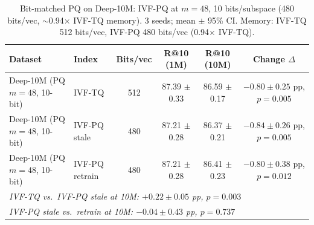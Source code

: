 \begin{table}[t]
\caption{Bit-matched PQ on Deep-10M: IVF-PQ at $m{=}48$, 10 bits/subspace (480 bits/vec, $\sim$0.94$\times$ IVF-TQ memory). 3 seeds; mean $\pm$ 95\% CI. Memory: IVF-TQ 512 bits/vec, IVF-PQ 480 bits/vec (0.94$\times$ IVF-TQ).}
\label{tab:streaming_deep10m_pqmatched}
\centering\small
\begin{tabular}{llcccc}
\toprule
Dataset & Index & Bits/vec & R@10 (1M) & R@10 (10M) & Change $\Delta$ \\
\midrule
  Deep-10M (PQ $m{=}48$, 10-bit) & IVF-TQ & 512 & 87.39 $\pm$ 0.33 & 86.59 $\pm$ 0.17 & $-0.80 \pm 0.25$ pp, $p=0.005$ \\
  Deep-10M (PQ $m{=}48$, 10-bit) & IVF-PQ stale & 480 & 87.21 $\pm$ 0.28 & 86.37 $\pm$ 0.21 & $-0.84 \pm 0.26$ pp, $p=0.005$ \\
  Deep-10M (PQ $m{=}48$, 10-bit) & IVF-PQ retrain & 480 & 87.21 $\pm$ 0.28 & 86.41 $\pm$ 0.23 & $-0.80 \pm 0.38$ pp, $p=0.012$ \\
\midrule
\multicolumn{6}{l}{\textit{IVF-TQ vs.\ IVF-PQ stale at 10M: $+0.22 \pm 0.05$ pp, $p=0.003$}} \\
\multicolumn{6}{l}{\textit{IVF-PQ stale vs.\ retrain at 10M: $-0.04 \pm 0.43$ pp, $p=0.737$}} \\
\bottomrule
\end{tabular}
\end{table}
